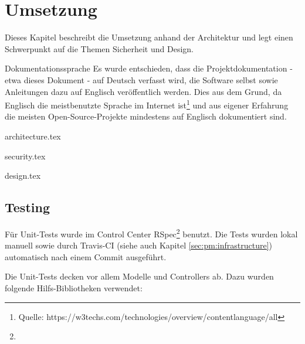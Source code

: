 \begin{comment}
(Implementierung) Architektur und Design beschrieben: Mit begründeten Architekturentscheidungen, mit Diskussion, wie Qualitätsattribute sichergestellt wurden (welche Qualität wurde erreicht?), mit Dokumentation, welche Experimente/Tests durchgeführt wurden und welche Lösungsoptionen aufgrund der Ergebnisse dieser Experimente/Tests
verworfen wurden (was ging schief?)
\end{comment}

\chapter{Umsetzung}
Dieses Kapitel beschreibt die Umsetzung anhand der Architektur und legt einen Schwerpunkt auf die Themen Sicherheit und Design.

\begin{decision}{Dokumentationssprache}
Es wurde entschieden, dass die Projektdokumentation - etwa dieses Dokument - auf Deutsch verfasst wird, die Software selbst sowie Anleitungen dazu auf Englisch veröffentlich werden. Dies aus dem Grund, da Englisch die meistbenutzte Sprache im Internet ist\footnote{Quelle: https://w3techs.com/technologies/overview/content\textunderscore language/all} und aus eigener Erfahrung die meisten Open-Source-Projekte mindestens auf Englisch dokumentiert sind.

\end{decision}



{architecture.tex}

\clearpage
{security.tex}

\clearpage
{design.tex}

\clearpage
\section{Testing} \label{sec:umsetzung:testing}


Für Unit-Tests wurde im Control Center RSpec\footnote{} benutzt. Die Tests wurden lokal manuell sowie durch Travis-CI (siehe auch Kapitel \ref{sec:pm:infrastructure}) automatisch nach einem Commit ausgeführt.

Die Unit-Tests decken vor allem Modelle und Controllers ab. Dazu wurden folgende Hilfs-Bibliotheken verwendet:

